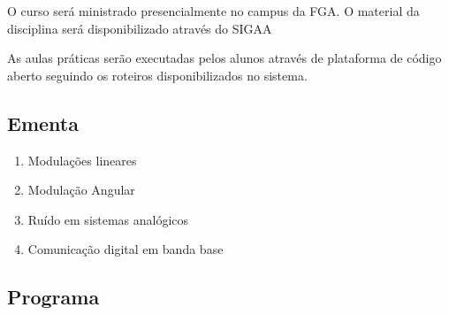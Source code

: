     O curso será ministrado presencialmente no campus da FGA. O material da disciplina será disponibilizado através do SIGAA 

    As aulas práticas serão executadas pelos alunos através de plataforma de código aberto seguindo os roteiros disponibilizados no sistema.  
    
  
  \begin{snugshade}
  \section{Ementa} 
  \end{snugshade}
  
  \begin{enumerate}
      \item Modulações lineares
      \item Modulação Angular
      \item Ruído em sistemas analógicos 
      \item Comunicação digital em banda base 
  \end{enumerate}
  
\newpage
  \begin{snugshade}
  \section{Programa} 
  \end{snugshade}
  
